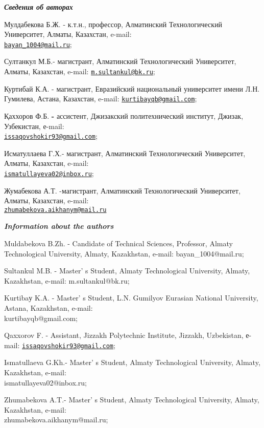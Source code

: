 \begin{authorinfo}
\emph{{\bfseries Сведения об авторах}}

Мулдабекова Б.Ж. - к.т.н., профессор, Алматинский Технологический
Университет, Алматы, Казахстан, e-mail:\\
\href{mailto:bayan_1004@mail.ru}{\nolinkurl{bayan\_1004@mail.ru}};

Султанкул М.Б.- магистрант, Алматинский Технологический Университет,
Алматы, Казахстан, e-mail:
\href{mailto:m.sultankul@bk.ru}{\nolinkurl{m.sultankul@bk.ru}};

Куртибай К.А. - магистрант, Евразийский национальный университет имени
Л.Н. Гумилева, Астана, Казахстан, e-mail:
\href{mailto:kurtibayqb@gmail.com}{\nolinkurl{kurtibayqb@gmail.com}};

Қаххоров Ф.Б. {\bfseries -} ассистент, Джизакский политехнический институт,
Джизак, Узбекистан, е-mail:\\
\href{mailto:issaqovshokir93@gmail.com}{\nolinkurl{issaqovshokir93@gmail.com}};

Исматуллаева Г.Х.- магистрант, Алматинский Технологический Университет,
Алматы, Казахстан, e-mail:\\
\href{mailto:ismatullayeva02@inbox.ru}{\nolinkurl{ismatullayeva02@inbox.ru}};

Жумабекова А.Т. -магистрант, Алматинский Технологический Университет,
Алматы, Казахстан, e-mail:\\
\href{mailto:zhumabekova.aikhanym@mail.ru}{\nolinkurl{zhumabekova.aikhanym@mail.ru}}

\emph{{\bfseries Information about the authors}}

Muldabekova B.Zh. - Candidate of Technical Sciences, Professor, Almaty
Technological University, Almaty, Kazakhstan, e-mail:
bayan\_1004@mail.ru;

Sultankul M.B. - Master' s Student, Almaty Technological
University, Almaty, Kazakhstan, e-mail: m.sultankul@bk.ru;

Kurtibaу K.A. - Master' s Student, L.N. Gumilyov Eurasian
National University, Astana, Kazakhstan, e-mail: \\kurtibayqb@gmail.com;

Qaxxorov F. - Assistant, Jizzakh Polytechnic Institute, Jizzakh,
Uzbekistan, е-mail:
\href{mailto:issaqovshokir93@gmail.com}{\nolinkurl{issaqovshokir93@gmail.com}};

Ismatullaeva G.Kh.- Master' s Student, Almaty
Technological University, Almaty, Kazakhstan, e-mail:\\
ismatullayeva02@inbox.ru;

Zhumabekova A.T.- Master' s Student, Almaty Technological
University, Almaty, Kazakhstan, e-mail: \\zhumabekova.aikhanym@mail.ru;
\end{authorinfo}
